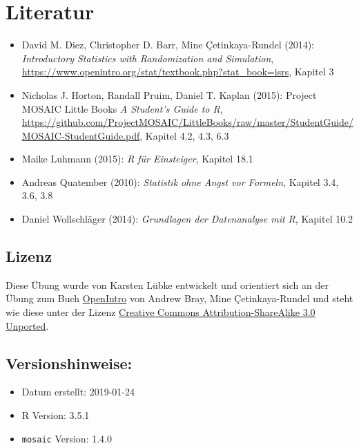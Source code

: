 \documentclass[12pt,ngerman,paper=a4,pagesize,DIV=13]{scrreprt}
\providecommand{\tightlist}{%
  \setlength{\itemsep}{0pt}\setlength{\parskip}{0pt}}
\begin{document}
\hypertarget{literatur-3}{%
\section{Literatur}\label{literatur-3}}

\begin{itemize}
\tightlist
\item
  David M. Diez, Christopher D. Barr, Mine Çetinkaya-Rundel (2014):
  \emph{Introductory Statistics with Randomization and Simulation},
  \url{https://www.openintro.org/stat/textbook.php?stat_book=isrs},
  Kapitel 3
\item
  Nicholas J. Horton, Randall Pruim, Daniel T. Kaplan (2015): Project
  MOSAIC Little Books \emph{A Student's Guide to R},
  \url{https://github.com/ProjectMOSAIC/LittleBooks/raw/master/StudentGuide/MOSAIC-StudentGuide.pdf},
  Kapitel 4.2, 4.3, 6.3
\item
  Maike Luhmann (2015): \emph{R für Einsteiger}, Kapitel 18.1
\item
  Andreas Quatember (2010): \emph{Statistik ohne Angst vor Formeln},
  Kapitel 3.4, 3.6, 3.8
\item
  Daniel Wollschläger (2014): \emph{Grundlagen der Datenanalyse mit R},
  Kapitel 10.2
\end{itemize}

\hypertarget{lizenz-3}{%
\subsection{Lizenz}\label{lizenz-3}}

Diese Übung wurde von Karsten Lübke entwickelt und orientiert sich an
der Übung zum Buch
\href{https://www.openintro.org/stat/index.php?stat_book=isrs}{OpenIntro}
von Andrew Bray, Mine Çetinkaya-Rundel und steht wie diese unter der
Lizenz \href{http://creativecommons.org/licenses/by-sa/3.0}{Creative
Commons Attribution-ShareAlike 3.0 Unported}.

\hypertarget{versionshinweise-3}{%
\subsection{Versionshinweise:}\label{versionshinweise-3}}

\begin{itemize}
\tightlist
\item
  Datum erstellt: 2019-01-24
\item
  R Version: 3.5.1
\item
  \texttt{mosaic} Version: 1.4.0
\end{itemize}
\end{document}
